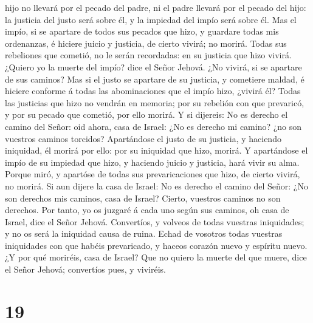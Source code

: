 hijo no llevará por el pecado del padre, ni el padre llevará por el
pecado del hijo: la justicia del justo será sobre él, y la impiedad del
impío será sobre él.  Mas el impío, si se apartare de
todos sus pecados que hizo, y guardare todas mis ordenanzas, é hiciere
juicio y justicia, de cierto vivirá; no morirá.  Todas
sus rebeliones que cometió, no le serán recordadas: en su justicia que
hizo vivirá.  ¿Quiero yo la muerte del impío? dice el
Señor Jehová. ¿No vivirá, si se apartare de sus caminos? 
Mas si el justo se apartare de su justicia, y cometiere maldad, é
hiciere conforme á todas las abominaciones que el impío hizo, ¿vivirá
él? Todas las justicias que hizo no vendrán en memoria; por su rebelión
con que prevaricó, y por su pecado que cometió, por ello morirá.
 Y si dijereis: No es derecho el camino del Señor: oid
ahora, casa de Israel: ¿No es derecho mi camino? ¿no son vuestros
caminos torcidos?  Apartándose el justo de su justicia, y
haciendo iniquidad, él morirá por ello: por su iniquidad que hizo,
morirá.  Y apartándose el impío de su impiedad que hizo,
y haciendo juicio y justicia, hará vivir su alma.  Porque
miró, y apartóse de todas sus prevaricaciones que hizo, de cierto
vivirá, no morirá.  Si aun dijere la casa de Israel: No
es derecho el camino del Señor: ¿No son derechos mis caminos, casa de
Israel? Cierto, vuestros caminos no son derechos.  Por
tanto, yo os juzgaré á cada uno según sus caminos, oh casa de Israel,
dice el Señor Jehová. Convertíos, y volveos de todas vuestras
iniquidades; y no os será la iniquidad causa de ruina. 
Echad de vosotros todas vuestras iniquidades con que habéis prevaricado,
y haceos corazón nuevo y espíritu nuevo. ¿Y por qué moriréis, casa de
Israel?  Que no quiero la muerte del que muere, dice el
Señor Jehová; convertíos pues, y viviréis.

\hypertarget{section-18}{%
\section{19}\label{section-18}}

